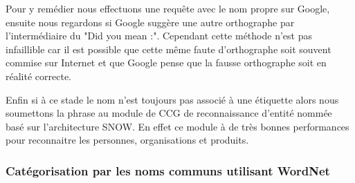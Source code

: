 \documentclass[10pt,a4paper]{article}
\begin{document}
\par Pour y remédier nous effectuons une requête avec le nom propre sur Google, ensuite nous regardons si Google suggère une autre orthographe par l'intermédiaire du "Did you mean :". Cependant cette méthode n'est pas infaillible car il est possible que cette même faute d'orthographe soit souvent commise sur Internet et que Google pense que la fausse orthographe soit en réalité correcte.
\par Enfin si à ce stade le nom n'est toujours pas associé à une étiquette alors nous soumettons la phrase au module de CCG de reconnaissance d'entité nommée~\cite{ratinov:paper} basé sur l'architecture SNOW. En effet ce module à de très bonnes performances pour reconnaitre les personnes, organisations et produits.


\subsubsection{Catégorisation par les noms communs utilisant WordNet}
\end{document}
